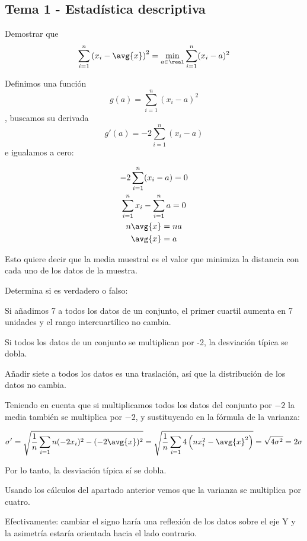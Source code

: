 \subsection{Tema 1 - Estadística descriptiva}

\begin{problem}[2] Demostrar que \[ \sum_{i=1}^n \left(x_i-\avg{x}\right)^2 = \min_{a\in \real} \sum_{i=1}^n(x_i-a)^2 \]

\solution

Definimos una función \[ g(a) = \sum_{i=1}^n(x_i-a)^2 \], buscamos su derivada \[ g'(a) = -2 \sum_{i=1}^n(x_i-a) \] e igualamos a cero:

\begin{gather*}
-2 \sum_{i=1}^n(x_i-a) = 0 \\
\sum_{i=1}^n x_i - \sum_{i=1}^n a = 0 \\
n \avg{x} = n a \\
\avg{x} = a 
\end{gather*}

Esto quiere decir que la media muestral es el valor que minimiza la distancia con cada uno de los datos de la muestra.
\end{problem}

\begin{problem}[5]Determina si es verdadero o falso:

\ppart Si añadimos 7 a todos los datos de un conjunto, el primer cuartil aumenta en 7 unidades y el rango intercuartílico no cambia.

\ppart Si todos los datos de un conjunto se multiplican por -2, la desviación típica se dobla.
\solution 

\spart Añadir siete a todos los datos es una traslación, así que la distribución de los datos no cambia.

\spart Teniendo en cuenta que si multiplicamos todos los datos del conjunto por $-2$ la media también se multiplica por $-2$, y sustituyendo en la fórmula de la varianza:

\[ \sigma' = \sqrt{\frac{1}{n} \sum_{i=1}n (-2x_i)^2 - (-2\avg{x})^2} = \sqrt{\frac{1}{n} \sum_{i=1}4\left(n x_i^2 - \avg{x}^2\right)} = \sqrt{4\sigma^2} = 2\sigma \]

Por lo tanto, la desviación típica sí se dobla.

\spart Usando los cálculos del apartado anterior vemos que la varianza se multiplica por cuatro.

\spart Efectivamente: cambiar el signo haría una reflexión de los datos sobre el eje Y y la asimetría estaría orientada hacia el lado contrario. 

\end{problem}

